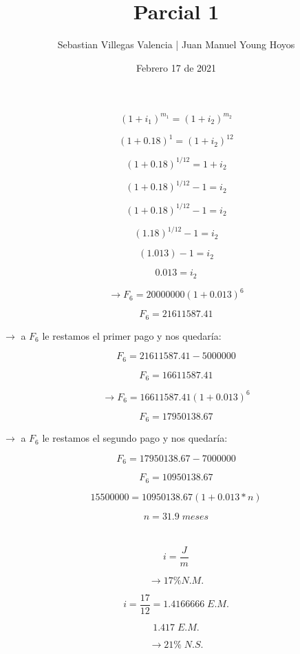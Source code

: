 \documentclass[12pt, letterpaper, twoside]{article}
\title{Parcial 1}
\date{Febrero 17 de 2021}
\author{Sebastian Villegas Valencia | Juan Manuel Young Hoyos}
\begin{document}
    \maketitle

    \section{}


    \[ (1 + i_1)^{m_1} =  (1 + i_2)^{m_2} \]

    \[ (1 + 0.18)^{1} =  (1 + i_2)^{12} \]

    \[ (1 + 0.18)^{1/12} =  1 + i_2 \]

    \[ (1 + 0.18)^{1/12} - 1 = i_2 \]

    \[ (1 + 0.18)^{1/12} - 1 = i_2 \]

    \[ (1.18)^{1/12} - 1 = i_2 \]

    \[ (1.013) - 1 = i_2 \]

    \[ 0.013 = i_2 \]

    \[ \rightarrow F_6 = 20000000 (1 + 0.013)^6 \]

    \[ F_6 = 21611587.41 \]
    
    \( \rightarrow \) a \( F_6 \) le restamos el primer pago y nos quedaría:

    \[ F_6 = 21611587.41 - 5000000 \]

    \[ F_6 = 16611587.41\]

    \[ \rightarrow F_6 = 16611587.41 (1 + 0.013)^6 \]

    \[ F_6 = 17950138.67\]

    \( \rightarrow \) a \( F_6 \) le restamos el segundo pago y nos quedaría:

    \[ F_6 = 17950138.67 - 7000000 \]

    \[ F_6 = 10950138.67 \]

    \[ 15500000 = 10950138.67 (1 + 0.013 * n) \]

    \[ n = 31.9 \; meses \]

\section{}

\[ i = \frac{J}{m} \]

\[ \rightarrow 17\% N.M. \]

\[ i = \frac{17}{12} = 1.4166666 \; E.M. \]

\[ 1.417 \; E.M. \]

\[ \rightarrow 21\% \; N.S. \]
\end{document}
